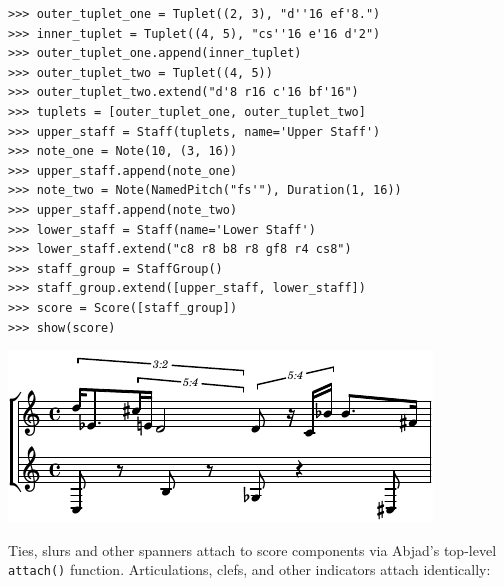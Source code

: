 \documentclass{article}
\begin{document}

\begin{lstlisting}
>>> outer_tuplet_one = Tuplet((2, 3), "d''16 ef'8.")
>>> inner_tuplet = Tuplet((4, 5), "cs''16 e'16 d'2")
>>> outer_tuplet_one.append(inner_tuplet)
>>> outer_tuplet_two = Tuplet((4, 5))
>>> outer_tuplet_two.extend("d'8 r16 c'16 bf'16")
>>> tuplets = [outer_tuplet_one, outer_tuplet_two]
>>> upper_staff = Staff(tuplets, name='Upper Staff')
>>> note_one = Note(10, (3, 16))
>>> upper_staff.append(note_one)
>>> note_two = Note(NamedPitch("fs'"), Duration(1, 16))
>>> upper_staff.append(note_two)
>>> lower_staff = Staff(name='Lower Staff')
>>> lower_staff.extend("c8 r8 b8 r8 gf8 r4 cs8")
>>> staff_group = StaffGroup()
>>> staff_group.extend([upper_staff, lower_staff])
>>> score = Score([staff_group])
>>> show(score)
\end{lstlisting}
\includegraphics{assets/lilypond-1c885bfebd0d1fe0357ba25ba72d36ba.pdf}

\noindent Ties, slurs and other spanners attach to score components via Abjad's
top-level \texttt{attach()} function. Articulations, clefs,
and other indicators attach identically:

\end{document}
